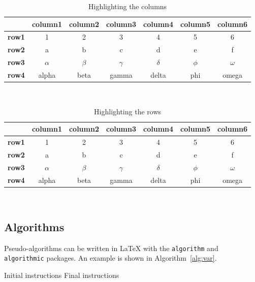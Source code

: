 \documentclass{report}
\begin{document}
\begin{table}[H]
\centering 
    \begin{tabular}{|p{3em} | c | c | c | c | c | c|}
    \hline
     & \textbf{column1} & \textbf{column2} & \textbf{column3} & \textbf{column4} & \textbf{column5} & \textbf{column6} \T\B \\
    \hline \hline
    \textbf{row1} & 1 & 2 & 3 & 4 & 5 & 6 \T\B\\
    \textbf{row2} & a & b & c & d & e & f \T\B\\
    \textbf{row3} & $\alpha$ & $\beta$ & $\gamma$ & $\delta$ & $\phi$ & $\omega$ \T\B\\
    \textbf{row4} & alpha & beta & gamma & delta & phi & omega \B\\
    \hline
    \end{tabular}
    \\[10pt]
    \caption{Highlighting the columns}
    \label{table:exampleC}
\end{table}

\begin{table}[H]
\centering 
    \begin{tabular}{|p{3em} c c c c c c|}
    \hline
     & \textbf{column1} & \textbf{column2} & \textbf{column3} & \textbf{column4} & \textbf{column5} & \textbf{column6} \T\B \\
    \hline \hline
    \textbf{row1} & 1 & 2 & 3 & 4 & 5 & 6 \T\B\\
    \hline
    \textbf{row2} & a & b & c & d & e & f \T\B\\
    \hline
    \textbf{row3} & $\alpha$ & $\beta$ & $\gamma$ & $\delta$ & $\phi$ & $\omega$ \T\B\\
    \hline
    \textbf{row4} & alpha & beta & gamma & delta & phi & omega \B\\
    \hline
    \end{tabular}
    \\[10pt]
    \caption{Highlighting the rows}
    \label{table:exampleR}
\end{table}

\subsection{Algorithms}
\label{subsec:algorithms}

Pseudo-algorithms can be written in \LaTeX{} with the \texttt{algorithm} and \texttt{algorithmic} packages.
An example is shown in Algorithm~\ref{alg:var}.
\begin{algorithm}[H]
    \label{alg:example}
    \caption{Name of the Algorithm}
    \label{alg:var}
    \label{protocol1}
    \begin{algorithmic}[1]
    \STATE Initial instructions
    \ENDIF
    \ENDFOR
    \ENDWHILE
    \STATE Final instructions
    \end{algorithmic}
\end{algorithm} 
\end{document}
